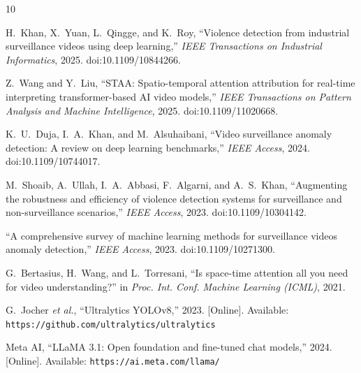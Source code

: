 \documentclass[conference]{IEEEtran}
\begin{document}
\begin{thebibliography}{10}

H.~Khan, X.~Yuan, L.~Qingge, and K.~Roy,
``Violence detection from industrial surveillance videos using deep
learning,''
\textit{IEEE Transactions on Industrial Informatics}, 2025.
doi:10.1109/10844266.

Z.~Wang and Y.~Liu,
``STAA: Spatio-temporal attention attribution for real-time interpreting
transformer-based AI video models,''
\textit{IEEE Transactions on Pattern Analysis and Machine Intelligence},
2025.
doi:10.1109/11020668.

K.~U.~Duja, I.~A.~Khan, and M.~Alsuhaibani,
``Video surveillance anomaly detection: A review on deep learning
benchmarks,''
\textit{IEEE Access}, 2024.
doi:10.1109/10744017.

M.~Shoaib, A.~Ullah, I.~A.~Abbasi, F.~Algarni, and A.~S.~Khan,
``Augmenting the robustness and efficiency of violence detection systems
for surveillance and non-surveillance scenarios,''
\textit{IEEE Access}, 2023.
doi:10.1109/10304142.

``A comprehensive survey of machine learning methods for surveillance
videos anomaly detection,''
\textit{IEEE Access}, 2023.
doi:10.1109/10271300.

G.~Bertasius, H.~Wang, and L.~Torresani,
``Is space-time attention all you need for video understanding?''
in \textit{Proc. Int. Conf. Machine Learning (ICML)}, 2021.

G.~Jocher \textit{et al.},
``Ultralytics YOLOv8,'' 2023.
[Online]. Available: \texttt{https://github.com/ultralytics/ultralytics}

Meta AI,
``LLaMA 3.1: Open foundation and fine-tuned chat models,'' 2024.
[Online]. Available: \texttt{https://ai.meta.com/llama/}

\end{thebibliography}
\end{document}
